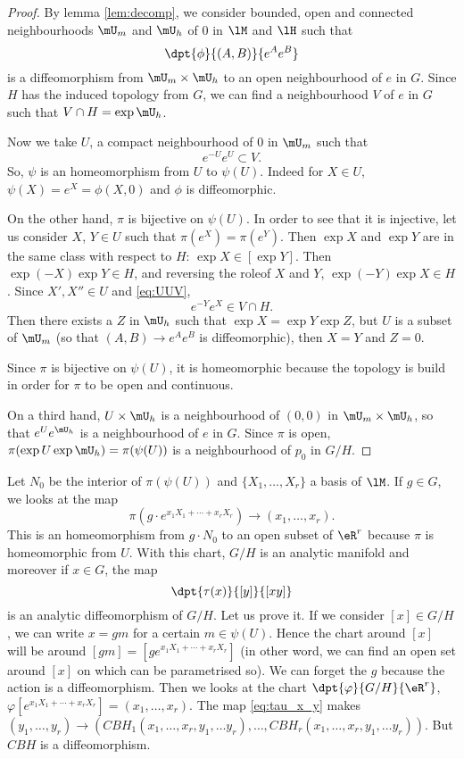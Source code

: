 \begin{proof}
By lemma \ref{lem:decomp}, we consider bounded, open and connected neighbourhoods $\mU_m$ and $\mU_h$ of $0$ in $\lM$ and $\lH$ such that 
\[
  \dpt{\phi}{(A,B)}{e^Ae^B}
\]
is a diffeomorphism from $\mU_m\times\mU_h$ to an open neighbourhood of $e$ in $G$. Since $H$ has the induced topology from $G$, we can find a neighbourhood $V$ of $e$ in $G$ such that $V\cap H=\exp\mU_h$. 

Now we take $U$, a compact neighbourhood of $0$ in $\mU_m$ such that 
\begin{equation}\label{eq:UUV}
  e^{-U}e^{U}\subset V.
\end{equation}
So, $\psi$ is an homeomorphism from $U$ to $\psi(U)$. Indeed for $X\in U$, $\psi(X)=e^X=\phi(X,0)$ and $\phi$ is diffeomorphic. 

On the other hand, $\pi$ is bijective on $\psi(U)$. In order to see that it is injective, let us consider $X$, $Y\in U$ such that $\pi(e^{X})=\pi(e^{Y})$. Then $\exp X$ and $\exp Y$ are in the same class with respect to $H$: $\exp X\in[\exp Y]$. Then $\exp(-X)\exp Y\in H$, and reversing the role\angl of $X$ and $Y$, $\exp(-Y)\exp X\in H$. Since $X',X''\in U$ and \eqref{eq:UUV}, 
\[
  e^{-Y}e^{X}\in V\cap H.
\]
Then there exists a $Z$ in $\mU_h$ such that $\exp X=\exp Y\exp Z$, but $U$ is a subset of $\mU_m$ (so that $(A,B)\to e^Ae^B$ is diffeomorphic), then $X=Y$ and $Z=0$.

Since $\pi$ is bijective on $\psi(U)$, it is homeomorphic because the topology is build in order for $\pi$ to be open and continuous.

On a third hand, $U\times\mU_h$ is a neighbourhood of $(0,0)$ in $\mU_m\times\mU_h$, so that $e^Ue^{\mU_h}$ is a neighbourhood of $e$ in $G$. Since $\pi$ is open, $\pi(\exp U\exp \mU_h)=\pi(\psi(U))$ is a neighbourhood of $p_0$ in $G/H$.
\end{proof}


Let $N_0$ be the interior of $\pi(\psi(U))$ and $\{X_1,\ldots, X_r\}$ a basis of $\lM$. If $g\in G$, we looks at the map
\[
  \pi(g\cdot e^{x_1X_1+\cdots+x_rX_r})\to(x_1,\ldots,x_r).
\]
This is an homeomorphism from $g\cdot N_0$ to an open subset of $\eR^r$ because $\pi$ is homeomorphic from $U$. With this chart, $G/H$ is an analytic manifold  and moreover if $x\in G$, the map
\begin{equation}\label{eq:tau_x_y}
  \dpt{\tau(x)}{[y]}{[xy]}
\end{equation}
is an analytic diffeomorphism of $G/H$. Let us prove it. If we consider $[x]\in G/H$, we can write $x=gm$ for a certain $m\in\psi(U)$. Hence the chart around $[x]$ will be around $[gm]=[ge^{x_1X_1+\cdots+x_rX_r}]$ (in other word, we can find an open set around $[x]$ on which can be parametrised so). We can forget the $g$ because the action is a diffeomorphism. Then we looks at the chart $\dpt{\varphi}{G/H}{\eR^r}$, $\varphi[e^{x_1X_1+\cdots+x_rX_r}]=(x_1,\ldots,x_r)$. The map \eqref{eq:tau_x_y} makes $(y_1,\ldots,y_r)\to( CBH_1(x_1,\ldots,x_r,y_1,\ldots y_r),\ldots, CBH_r(x_1,\ldots,x_r,y_1,\ldots y_r))$. But $CBH$ is a diffeomorphism.


